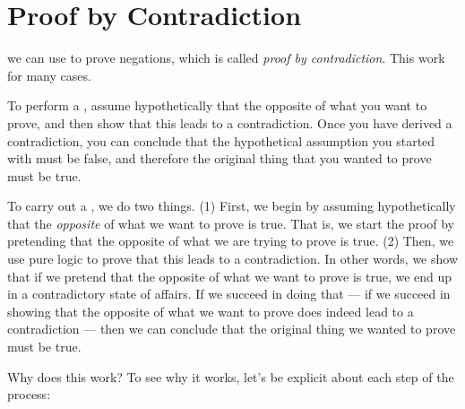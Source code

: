 \documentclass[../../../main.tex]{subfiles}
\begin{document}
\section{Proof by Contradiction}

 we can use to prove negations, which is called \emph{proof by contradiction}. This work for many cases.

\begin{terminology}
  To perform a , assume hypothetically that the opposite of what you want to prove, and then show that this leads to a contradiction. Once you have derived a contradiction, you can conclude that the hypothetical assumption you started with must be false, and therefore the original thing that you wanted to prove must be true.
\end{terminology}

To carry out a , we do two things. (1) First, we begin by assuming hypothetically that the \emph{opposite} of what we want to prove is true. That is, we start the proof by pretending that the opposite of what we are trying to prove is true. (2) Then, we use pure logic to prove that this leads to a contradiction. In other words, we show that if we pretend that the opposite of what we want to prove is true, we end up in a contradictory state of affairs. If we succeed in doing that --- if we succeed in showing that the opposite of what we want to prove does indeed lead to a contradiction --- then we can conclude that the original thing we wanted to prove must be true.

Why does this work? To see why it works, let's be explicit about each step of the process:
\end{document}

